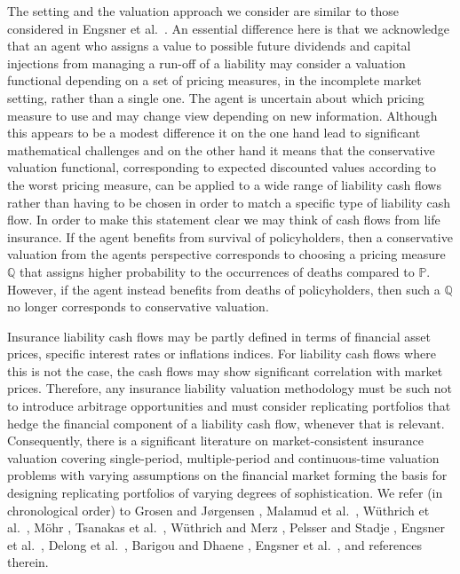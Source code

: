 \documentclass[11pt,a4paper]{article}
\renewcommand{\P}{\mathbb{P}}
\newcommand{\Q}{\mathbb{Q}}
\begin{document}
The setting and the valuation approach we consider are similar to those considered in Engsner et al.~\cite{Engsner-Lindensjo-Lindskog-20}. An essential difference here is that we acknowledge that an agent who assigns a value to possible future dividends and capital injections from managing a run-off of a liability may consider a valuation functional depending on a set of pricing measures, in the incomplete market setting, rather than a single one. The agent is uncertain about which pricing measure to use and may change view depending on new information. Although this appears to be a modest difference it on the one hand lead to significant mathematical challenges and on the other hand it means that the conservative valuation functional, corresponding to expected discounted values according to the worst pricing measure, can be applied to a wide range of liability cash flows rather than having to be chosen in order to match a specific type of liability cash flow. In order to make this statement clear we may think of cash flows from life insurance. If the agent benefits from survival of policyholders, then a conservative valuation from the agents perspective corresponds to choosing a pricing measure $\Q$ that assigns higher probability to the occurrences of deaths compared to $\P$. However, if the agent instead benefits from deaths of policyholders, then such a $\Q$ no longer corresponds to conservative valuation.  

Insurance liability cash flows may be partly defined in terms of financial asset prices, specific interest rates or inflations indices. For liability cash flows where this is not the case, the cash flows may show significant correlation with market prices. Therefore, any insurance liability valuation methodology must be such not to introduce arbitrage opportunities and must consider replicating portfolios that hedge the financial component of a liability cash flow, whenever that is relevant. Consequently, there is a significant literature on market-consistent insurance valuation covering single-period, multiple-period and continuous-time valuation problems with varying assumptions on the financial market forming the basis for designing replicating portfolios of varying degrees of sophistication. 
We refer (in chronological order) to 
Grosen and J{\o}rgensen \cite{Grosen-Jorgensen-02},  
Malamud et al.~\cite{Malamud-Trubowitz-Wuthrich-08}, 
W\"uthrich et al.~\cite{Wuthrich-Embrechts-Tsanakas-11}, 
M\"ohr \cite{Moehr-11}, 
Tsanakas et al.~\cite{Tsanakas-Wuthrich-Cerny-13}, 
W\"uthrich and Merz \cite{Wuthrich-Merz-13}, 
Pelsser and Stadje \cite{Pelsser-Stadje-14},    
Engsner et al.~\cite{Engsner-Lindholm-Lindskog-17}, 
Delong et al.~\cite{Delong-Dhaene-Barigou-19}, 
Barigou and Dhaene \cite{Barigou-Dhaene-19},  
Engsner et al.~\cite{Engsner-Lindensjo-Lindskog-20}, 
and references therein. 
\end{document}
